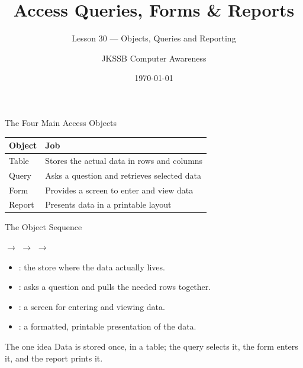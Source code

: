 \documentclass[aspectratio=169]{beamer}
\title{Access Queries, Forms \& Reports}
\subtitle{Lesson 30 --- Objects, Queries and Reporting}
\author{JKSSB Computer Awareness}
\date{\today}
\begin{document}
\frame{\titlepage}

\begin{frame}{The Four Main Access Objects}
  \begin{center}
    \begin{tabular}{p{}p{}}
      \toprule
      \textbf{Object} & \textbf{Job} \\
      \midrule
      Table & Stores the actual data in rows and columns \\
      Query & Asks a question and retrieves selected data \\
      Form & Provides a screen to enter and view data \\
      Report & Presents data in a printable layout \\
      \bottomrule
    \end{tabular}
  \end{center}
  \vspace{0.25cm}
\end{frame}

\begin{frame}{The Object Sequence}
  \begin{center}
     $\rightarrow$  $\rightarrow$ 
    $\rightarrow$ 
  \end{center}
  \vspace{0.2cm}
  \begin{itemize}
    \item {}: the store where the data actually lives.
    \item {}: asks a question and pulls the needed rows together.
    \item {}: a screen for entering and viewing data.
    \item {}: a formatted, printable presentation of the data.
  \end{itemize}
  \begin{block}{The one idea}
    Data is stored once, in a table; the query selects it, the form enters
    it, and the report prints it.
  \end{block}
\end{frame}
\end{document}
